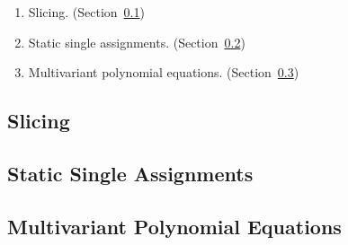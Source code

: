
\begin{enumerate}
\item Slicing. (Section~\ref{subsection:slicing})
\item Static single
  assignments. (Section~\ref{subsection:static-single-assignment})
\item Multivariant polynomial
  equations. (Section~\ref{subsection:multivariant-polynomial-equations})
\end{enumerate}

\subsection{Slicing}
\label{subsection:slicing}



\subsection{Static Single Assignments}
\label{subsection:static-single-assignment}



\subsection{Multivariant Polynomial Equations}
\label{subsection:multivariant-polynomial-equations}


